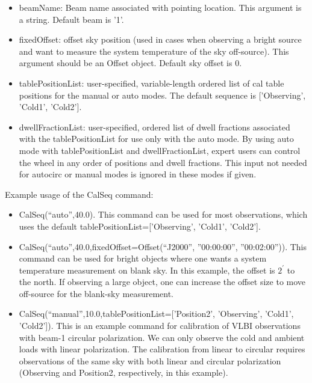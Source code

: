 \begin{itemize}
\item beamName: Beam name associated with pointing location. This
  argument is a string. Default beam is '1'.
    
\item fixedOffset: offset sky position (used in cases when observing a
  bright source and want to measure the system temperature of the sky
  off-source). This argument should be an Offset object. Default sky
  offset is 0.
    
\item tablePositionList: user-specified, variable-length ordered list
  of cal table positions for the manual or auto modes.  The default
  sequence is ['Observing', 'Cold1', 'Cold2'].
    
\item dwellFractionList: user-specified, ordered list of dwell
  fractions associated with the tablePositionList for use only with
  the auto mode. By using auto mode with tablePositionList and
  dwellFractionList, expert users can control the wheel in any order
  of positions and dwell fractions. This input not needed for autocirc
  or manual modes is ignored in these modes if given.

\end{itemize}

Example usage of the CalSeq command:

\begin{itemize}

\item CalSeq(``auto'',40.0).  This command can be used for most
  observations, which uses the default tablePositionList=['Observing',
  'Cold1', 'Cold2'].

\item CalSeq(``auto'',40.0,fixedOffset=Offset(``J2000'', ''00:00:00'',
  ''00:02:00'')).  This command can be used for bright objects where
  one wants a system temperature measurement on blank sky.  In this
  example, the offset is $2^{\prime}$ to the north.  If observing a
  large object, one can increase the offset size to move off-source
  for the blank-sky measurement.

\item CalSeq(``manual'',10.0,tablePositionList=['Position2',
  'Observing', 'Cold1', 'Cold2']).  This is an example command for
  calibration of VLBI observations with beam-1 circular polarization.
  We can only observe the cold and ambient loads with linear
  polarization.  The calibration from linear to circular requires
  observations of the same sky with both linear and circular
  polarization (Observing and Position2, respectively, in this
  example).

\end{itemize}


